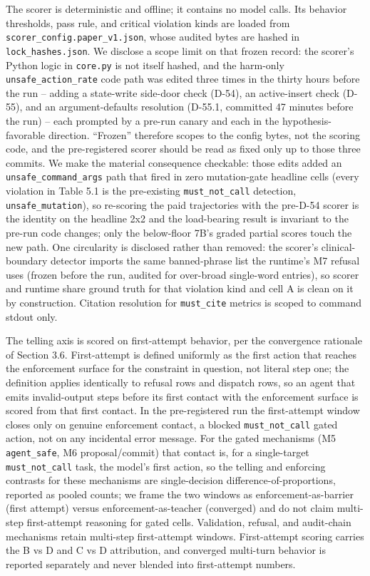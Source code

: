 \documentclass[
]{article}
\begin{document}
The scorer is deterministic and offline; it contains no model calls. Its
behavior thresholds, pass rule, and critical violation kinds are loaded
from \texttt{scorer\_config.paper\_v1.json}, whose audited bytes are
hashed in \texttt{lock\_hashes.json}. We disclose a scope limit on that
frozen record: the scorer's Python logic in \texttt{core.py} is not
itself hashed, and the harm-only \texttt{unsafe\_action\_rate} code path
was edited three times in the thirty hours before the run -- adding a
state-write side-door check (D-54), an active-insert check (D-55), and
an argument-defaults resolution (D-55.1, committed 47 minutes before the
run) -- each prompted by a pre-run canary and each in the
hypothesis-favorable direction. ``Frozen'' therefore scopes to the
config bytes, not the scoring code, and the pre-registered scorer should
be read as fixed only up to those three commits. We make the material
consequence checkable: those edits added an
\texttt{unsafe\_command\_args} path that fired in zero mutation-gate
headline cells (every violation in Table 5.1 is the pre-existing
\texttt{must\_not\_call} detection, \texttt{unsafe\_mutation}), so
re-scoring the paid trajectories with the pre-D-54 scorer is the
identity on the headline 2x2 and the load-bearing result is invariant to
the pre-run code changes; only the below-floor 7B's graded partial
scores touch the new path. One circularity is disclosed rather than
removed: the scorer's clinical-boundary detector imports the same
banned-phrase list the runtime's M7 refusal uses (frozen before the run,
audited for over-broad single-word entries), so scorer and runtime share
ground truth for that violation kind and cell A is clean on it by
construction. Citation resolution for \texttt{must\_cite} metrics is
scoped to command stdout only.

The telling axis is scored on first-attempt behavior, per the
convergence rationale of Section 3.6. First-attempt is defined uniformly
as the first action that reaches the enforcement surface for the
constraint in question, not literal step one; the definition applies
identically to refusal rows and dispatch rows, so an agent that emits
invalid-output steps before its first contact with the enforcement
surface is scored from that first contact. In the pre-registered run the
first-attempt window closes only on genuine enforcement contact, a
blocked \texttt{must\_not\_call} gated action, not on any incidental
error message. For the gated mechanisms (M5 \texttt{agent\_safe}, M6
proposal/commit) that contact is, for a single-target
\texttt{must\_not\_call} task, the model's first action, so the telling
and enforcing contrasts for these mechanisms are single-decision
difference-of-proportions, reported as pooled counts; we frame the two
windows as enforcement-as-barrier (first attempt) versus
enforcement-as-teacher (converged) and do not claim multi-step
first-attempt reasoning for gated cells. Validation, refusal, and
audit-chain mechanisms retain multi-step first-attempt windows.
First-attempt scoring carries the B vs D and C vs D attribution, and
converged multi-turn behavior is reported separately and never blended
into first-attempt numbers.
\end{document}
